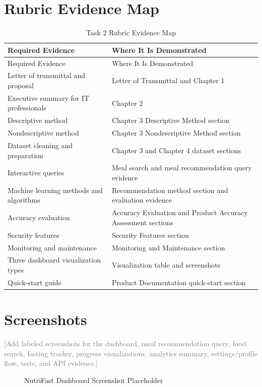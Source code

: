\documentclass[12pt]{report}
\newcommand{\placeholder}[1]{\textcolor{gray}{[#1]}}
\begin{document}
\chapter{Rubric Evidence Map}
\begin{longtable}{p{} p{}}
    \caption{Task 2 Rubric Evidence Map}\\
    \toprule
    Required Evidence & Where It Is Demonstrated \\
    \midrule
    \endfirsthead
    \toprule
    Required Evidence & Where It Is Demonstrated \\
    \midrule
    \endhead
    Letter of transmittal and proposal & Letter of Transmittal and Chapter 1 \\
    Executive summary for IT professionals & Chapter 2 \\
    Descriptive method & Chapter 3 Descriptive Method section \\
    Nondescriptive method & Chapter 3 Nondescriptive Method section \\
    Dataset cleaning and preparation & Chapter 3 and Chapter 4 dataset sections \\
    Interactive queries & Meal search and meal recommendation query evidence \\
    Machine learning methods and algorithms & Recommendation method section and evaluation evidence \\
    Accuracy evaluation & Accuracy Evaluation and Product Accuracy Assessment sections \\
    Security features & Security Features section \\
    Monitoring and maintenance & Monitoring and Maintenance section \\
    Three dashboard visualization types & Visualization table and screenshots \\
    Quick-start guide & Product Documentation quick-start section \\
    \bottomrule
\end{longtable}

\chapter{Screenshots}
\placeholder{Add labeled screenshots for the dashboard, meal recommendation query, food search, fasting tracker, progress visualizations, analytics summary, settings/profile flow, tests, and API evidence.}

\begin{figure}[H]
    \centering
    \caption{NutriFast Dashboard Screenshot Placeholder}
    \label{fig:dashboard-placeholder}
\end{figure}
\end{document}
